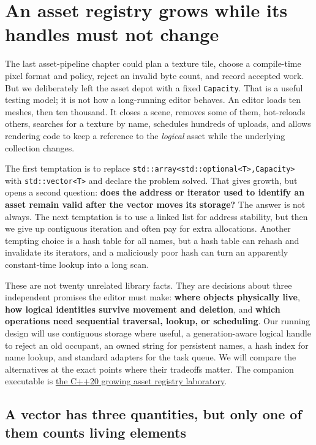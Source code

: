 \section{An asset registry grows while its handles must not change}\label{05-engine-i-ch005-an-asset-registry-grows-while-its-handles-must-not-change}

The last asset-pipeline chapter could plan a texture tile, choose a compile-time pixel format and policy, reject an invalid byte count, and record accepted work. But we deliberately left the asset depot with a fixed \texttt{Capacity}. That is a useful testing model; it is not how a long-running editor behaves. An editor loads ten meshes, then ten thousand. It closes a scene, removes some of them, hot-reloads others, searches for a texture by name, schedules hundreds of uploads, and allows rendering code to keep a reference to the \emph{logical} asset while the underlying collection changes.

The first temptation is to replace \texttt{std::array\textless{}std::optional\textless{}T\textgreater{},Capacity\textgreater{}} with \texttt{std::vector\textless{}T\textgreater{}} and declare the problem solved. That gives growth, but opens a second question: \textbf{does the address or iterator used to identify an asset remain valid after the vector moves its storage?} The answer is not always. The next temptation is to use a linked list for address stability, but then we give up contiguous iteration and often pay for extra allocations. Another tempting choice is a hash table for all names, but a hash table can rehash and invalidate its iterators, and a maliciously poor hash can turn an apparently constant-time lookup into a long scan.

These are not twenty unrelated library facts. They are decisions about three independent promises the editor must make: \textbf{where objects physically live}, \textbf{how logical identities survive movement and deletion}, and \textbf{which operations need sequential traversal, lookup, or scheduling}. Our running design will use contiguous storage where useful, a generation-aware logical handle to reject an old occupant, an owned string for persistent names, a hash index for name lookup, and standard adapters for the task queue. We will compare the alternatives at the exact points where their tradeoffs matter. The companion executable is \hyperref[source-file-e829cf731b17419e282775cf]{the C++20 growing asset registry laboratory}.

\subsection{A vector has three quantities, but only one of them counts living elements}\label{05-engine-i-ch005-a-vector-has-three-quantities-but-only-one-of-them-counts-living-elements}

